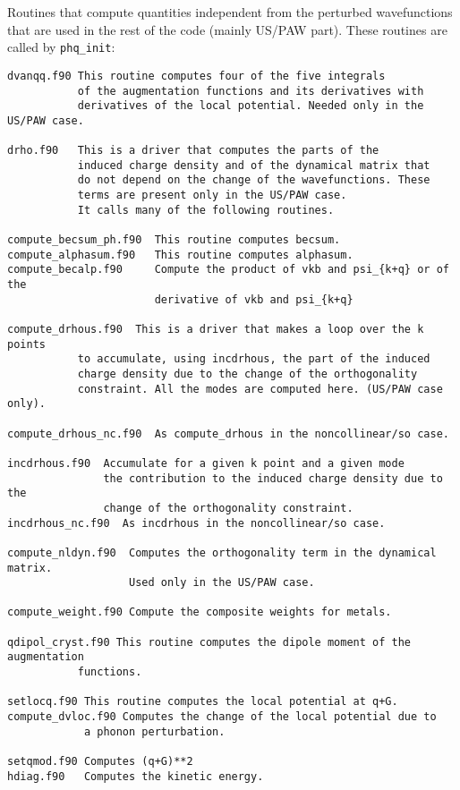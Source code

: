 \documentclass[12pt,a4paper]{article}
\begin{document}
Routines that compute quantities independent from the perturbed wavefunctions
that are used in the rest of the code (mainly US/PAW part). These
routines are called by \texttt{phq\_init}:

\begin{verbatim}
dvanqq.f90 This routine computes four of the five integrals  
           of the augmentation functions and its derivatives with 
           derivatives of the local potential. Needed only in the US/PAW case.

drho.f90   This is a driver that computes the parts of the
           induced charge density and of the dynamical matrix that
           do not depend on the change of the wavefunctions. These
           terms are present only in the US/PAW case.            
           It calls many of the following routines.

compute_becsum_ph.f90  This routine computes becsum.        
compute_alphasum.f90   This routine computes alphasum.           
compute_becalp.f90     Compute the product of vkb and psi_{k+q} or of the
                       derivative of vkb and psi_{k+q}

compute_drhous.f90  This is a driver that makes a loop over the k points
           to accumulate, using incdrhous, the part of the induced
           charge density due to the change of the orthogonality
           constraint. All the modes are computed here. (US/PAW case only).
                     
compute_drhous_nc.f90  As compute_drhous in the noncollinear/so case.

incdrhous.f90  Accumulate for a given k point and a given mode
               the contribution to the induced charge density due to the
               change of the orthogonality constraint.
incdrhous_nc.f90  As incdrhous in the noncollinear/so case.

compute_nldyn.f90  Computes the orthogonality term in the dynamical matrix.
                   Used only in the US/PAW case.         

compute_weight.f90 Compute the composite weights for metals.         

qdipol_cryst.f90 This routine computes the dipole moment of the augmentation
           functions.

setlocq.f90 This routine computes the local potential at q+G.
compute_dvloc.f90 Computes the change of the local potential due to
            a phonon perturbation.     

setqmod.f90 Computes (q+G)**2
hdiag.f90   Computes the kinetic energy.                      
\end{verbatim}
\end{document}
